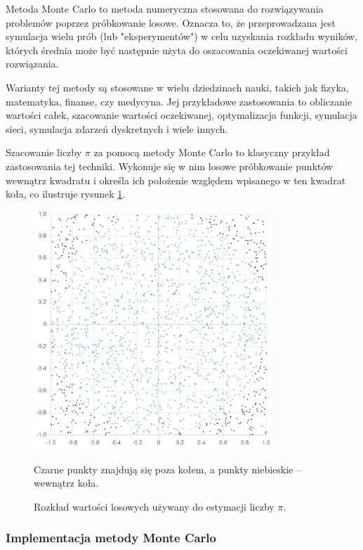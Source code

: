 Metoda Monte Carlo to metoda numeryczna stosowana do rozwiązywania problemów poprzez próbkowanie
losowe. Oznacza to, że przeprowadzana jest symulacja wielu prób (lub "eksperymentów") w celu uzyskania
rozkładu wyników, których średnia może być następnie użyta do oszacowania oczekiwanej wartości rozwiązania.

Warianty tej metody są stosowane w wielu dziedzinach nauki, takich jak fizyka, matematyka, finanse,
czy medycyna. Jej przykładowe zastosowania to obliczanie wartości całek, szacowanie wartości
oczekiwanej, optymalizacja funkcji, symulacja sieci, symulacja zdarzeń dyskretnych i wiele innych.

Szacowanie liczby $\pi$ za pomocą metody Monte Carlo to klasyczny przykład zastosowania tej techniki.
Wykonuje się w nim losowe próbkowanie punktów wewnątrz kwadratu i określa ich położenie względem
wpisanego w ten kwadrat koła, co ilustruje rysunek \ref{fig:monte-carlo}.

\begin{figure}[h]
	\centering
	\includegraphics[width=0.8\textwidth]{graf/Pi-estimation.png}
	\caption{Rozkład wartości losowych używany do estymacji liczby $\pi$.}
	\medskip \small
	Czarne punkty znajdują się poza kołem, a punkty niebieskie -- wewnątrz koła.
	\label{fig:monte-carlo}
\end{figure}

\subsubsection*{Implementacja metody Monte Carlo}

